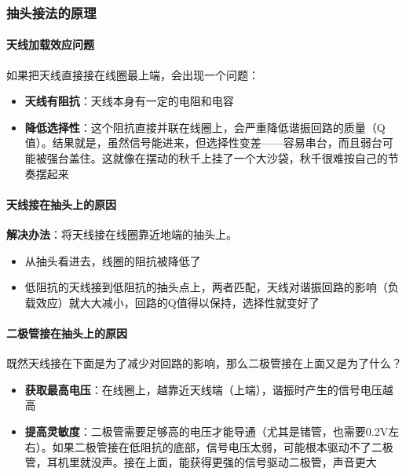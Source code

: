 \documentclass[12pt,UTF8]{ctexbook}
\begin{document}
\subsubsection{抽头接法的原理}

\paragraph{天线加载效应问题}

如果把天线直接接在线圈最上端，会出现一个问题：
\begin{itemize}[leftmargin=3.5em]
	\item \textbf{天线有阻抗}：天线本身有一定的电阻和电容
	\item \textbf{降低选择性}：这个阻抗直接并联在线圈上，会严重降低谐振回路的质量（Q值）。结果就是，虽然信号能进来，但选择性变差——容易串台，而且弱台可能被强台盖住。这就像在摆动的秋千上挂了一个大沙袋，秋千很难按自己的节奏摆起来
\end{itemize}

\paragraph{天线接在抽头上的原因}

\textbf{解决办法}：将天线接在线圈靠近地端的抽头上。
\begin{itemize}[leftmargin=3.5em]
	\item 从抽头看进去，线圈的阻抗被降低了
	\item 低阻抗的天线接到低阻抗的抽头点上，两者匹配，天线对谐振回路的影响（负载效应）就大大减小，回路的Q值得以保持，选择性就变好了
\end{itemize}

\paragraph{二极管接在抽头上的原因}

既然天线接在下面是为了减少对回路的影响，那么二极管接在上面又是为了什么？
\begin{itemize}[leftmargin=3.5em]
	\item \textbf{获取最高电压}：在线圈上，越靠近天线端（上端），谐振时产生的信号电压越高
	\item \textbf{提高灵敏度}：二极管需要足够高的电压才能导通（尤其是锗管，也需要0.2V左右）。如果二极管接在低阻抗的底部，信号电压太弱，可能根本驱动不了二极管，耳机里就没声。接在上面，能获得更强的信号驱动二极管，声音更大
\end{itemize}
\end{document}
